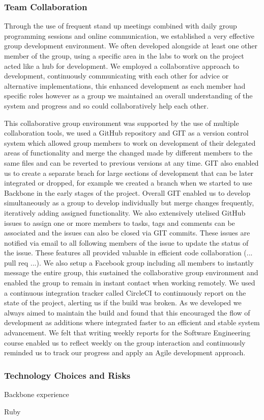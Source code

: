 \subsubsection{Team Collaboration}
Through the use of frequent stand up meetings combined with daily group programming sessions and online communication, we established a very effective group development environment. We often developed alongside at least one other member of the group, using a specific area in the labs to work on the project acted like a hub for development. We employed a collaborative approach to development, continuously communicating with each other for advice or alternative implementations, this enhanced development as each member had specific roles however as a group we maintained an overall understanding of the system and progress and so could collaboratively help each other.

This collaborative group environment was supported by the use of multiple collaboration tools, we used a GitHub repository and GIT as a version control system which allowed group members to work on development of their delegated areas of functionality and merge the changed made by different members to the same files and can be reverted to previous versions at any time. GIT also enabled us to create a separate brach for large sections of development that can be later integrated or dropped, for example we created a branch when we started to use Backbone in the early stages of the project. Overall GIT enabled us to develop simultaneously as a group to develop individually but merge changes frequently, iteratively adding assigned functionality. We also extensively utelised GitHub issues to assign one or more members to tasks, tags and comments can be associated and the issues can also be closed via GIT commits. These issues are notified via email to all following members of the issue to update the status of the issue. These features all provided valuable in efficient code collaboration (... pull req ...). We also setup a Facebook group including all members to instantly message the entire group, this sustained the collaborative group environment and enabled the group to remain in instant contact when working remotely. 
We used a continuous integration tracker called CircleCI to continuously report on the state of the project, alerting us if the build was broken. As we developed we always aimed to maintain the build and found that this encouraged the flow of development as additions where integrated faster to an efficient and stable system advancement.
We felt that writing weekly reports for the Software Engineering course enabled us to reflect weekly on the group interaction and continuously reminded us to track our progress and apply an Agile development approach.   

\subsubsection{Technology Choices and Risks}
Backbone experience

Ruby